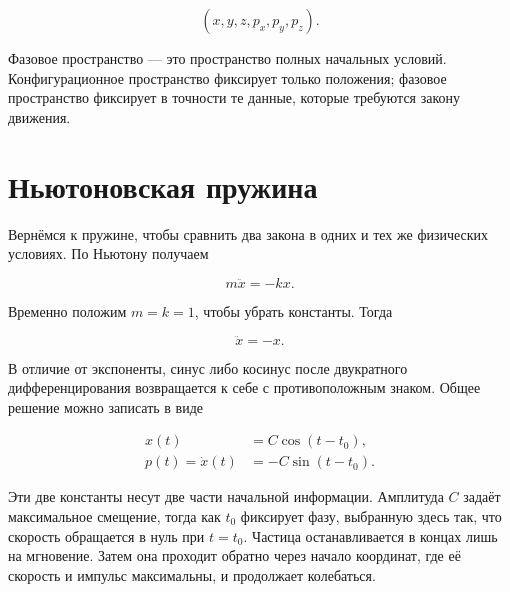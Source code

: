 \begin{equation}
  (x,y,z,p_x,p_y,p_z).
  \label{eq:one-particle-phase-space}
\end{equation}

Фазовое пространство — это пространство полных начальных условий. Конфигурационное пространство фиксирует только положения; фазовое пространство фиксирует в точности те данные, которые требуются закону движения.

\begin{classroomqa}
\end{classroomqa}

\section{Ньютоновская пружина}

Вернёмся к пружине, чтобы сравнить два закона в одних и тех же физических условиях. По Ньютону получаем

\begin{equation}
  m\ddot x=-kx.
  \label{eq:newton-spring}
\end{equation}

Временно положим \(m=k=1\), чтобы убрать константы. Тогда

\begin{equation}
  \ddot x=-x.
  \label{eq:normalized-oscillator}
\end{equation}

В отличие от экспоненты, синус либо косинус после двукратного дифференцирования возвращается к себе с противоположным знаком. Общее решение можно записать в виде

\begin{align}
  x(t)&=C\cos(t-t_0),
  \label{eq:oscillator-x}\\
  p(t)=\dot x(t)&=-C\sin(t-t_0).
  \label{eq:oscillator-p}
\end{align}

Эти две константы несут две части начальной информации. Амплитуда \(C\) задаёт максимальное смещение, тогда как \(t_0\) фиксирует фазу, выбранную здесь так, что скорость обращается в нуль при \(t=t_0\). Частица останавливается в концах лишь на мгновение. Затем она проходит обратно через начало координат, где её скорость и импульс максимальны, и продолжает колебаться.

